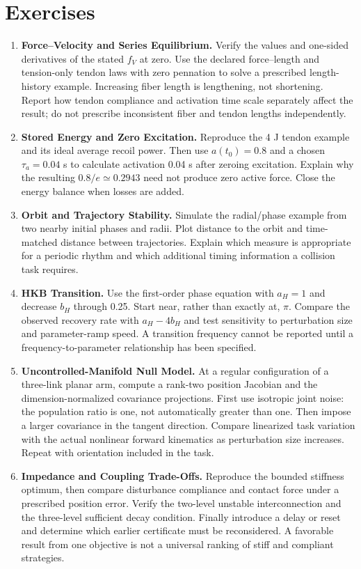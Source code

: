 \section*{Exercises}

\begin{enumerate}
\item \textbf{Force--Velocity and Series Equilibrium.}
Verify the values and one-sided derivatives of the stated $f_V$ at zero.
Use the declared force--length and tension-only tendon laws with zero pennation
to solve a prescribed length-history example. Increasing fiber length is
lengthening, not shortening. Report how tendon compliance and activation time
scale separately affect the result; do not prescribe inconsistent fiber and
tendon lengths independently.

\item \textbf{Stored Energy and Zero Excitation.}
Reproduce the 4 J tendon example and its ideal average recoil power. Then use
$a(t_0)=0.8$ and a chosen $\tau_a=0.04$ s to calculate activation 0.04 s after
zeroing excitation. Explain why the resulting $0.8/e\simeq0.2943$ need not
produce zero active force. Close the energy balance when losses are added.

\item \textbf{Orbit and Trajectory Stability.}
Simulate the radial/phase example from two nearby initial phases and radii.
Plot distance to the orbit and time-matched distance between trajectories.
Explain which measure is appropriate for a periodic rhythm and which additional
timing information a collision task requires.

\item \textbf{HKB Transition.}
Use the first-order phase equation with $a_H=1$ and decrease $b_H$ through
0.25. Start near, rather than exactly at, $\pi$. Compare the observed recovery
rate with $a_H-4b_H$ and test sensitivity to perturbation size and parameter-ramp
speed. A transition frequency cannot be reported until a frequency-to-parameter
relationship has been specified.

\item \textbf{Uncontrolled-Manifold Null Model.}
At a regular configuration of a three-link planar arm, compute a rank-two
position Jacobian and the dimension-normalized covariance projections.
First use isotropic joint noise: the population ratio is one, not automatically
greater than one. Then impose a larger covariance in the tangent direction.
Compare linearized task variation with the actual nonlinear forward kinematics
as perturbation size increases. Repeat with orientation included in the task.

\item \textbf{Impedance and Coupling Trade-Offs.}
Reproduce the bounded stiffness optimum, then compare disturbance compliance
and contact force under a prescribed position error. Verify the two-level
unstable interconnection and the three-level sufficient decay condition.
Finally introduce a delay or reset and determine which earlier certificate
must be reconsidered. A favorable result from one objective is not a universal
ranking of stiff and compliant strategies.
\end{enumerate}

